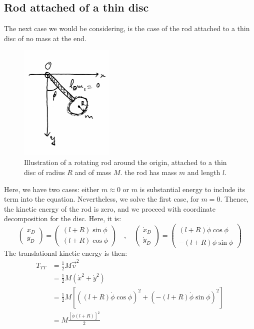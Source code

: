 \subsection{Rod attached of a thin disc}
The next case we would be considering, is the case of the rod attached to a thin disc of no mass at the end. 
\begin{figure}[htb]
    \centering
    \includegraphics[width=0.4\textwidth]{img/c5_rod_and_disk.jpg}
    \caption{Illustration of a rotating rod around the origin, attached to a thin disc of radius $R$ and of mass $M$. the rod has mass $m$ and length $l$.}
\end{figure}
Here, we have two cases: either $m\approx 0$ or $m$ is substantial energy to include its term into the equation. Nevertheless, we solve the first case, for $m=0$. Thence, the kinetic energy of the rod is zero, and we proceed with coordinate decomposition for the disc. Here, it is: 
\begin{equation}
    \begin{pmatrix}
        x_{D} \\
        y_{D}
    \end{pmatrix}
    =
    \begin{pmatrix}
        (l+R)\sin{\phi}\\
        (l+R)\cos{\phi}
    \end{pmatrix}
    \quad , \quad 
    \begin{pmatrix}
        \dot{x}_{D} \\
        \dot{y}_{D}
    \end{pmatrix}
    =
    \begin{pmatrix}
        (l+R)\dot{\phi}\cos{\phi}\\
        -(l+R)\dot{\phi}\sin{\phi}
    \end{pmatrix}
\end{equation}
The translational kinetic energy is then:
\begin{equation}
    \begin{split}
        T_{TT} 
        & = \frac{1}{2}M\vec{v}^{2}\\
        & = \frac{1}{2}M (\dot{x}^{2}+\dot{y}^{2})\\
        & = \frac{1}{2}M \left[ \left((l+R)\dot{\phi}\cos{\phi}\right)^{2} + \left(-(l+R)\dot{\phi}\sin{\phi}\right)^{2} \right]\\
        & = M \frac{\left[\dot{\phi}(l+R)\right]^{2}}{2}
    \end{split}
\end{equation}
